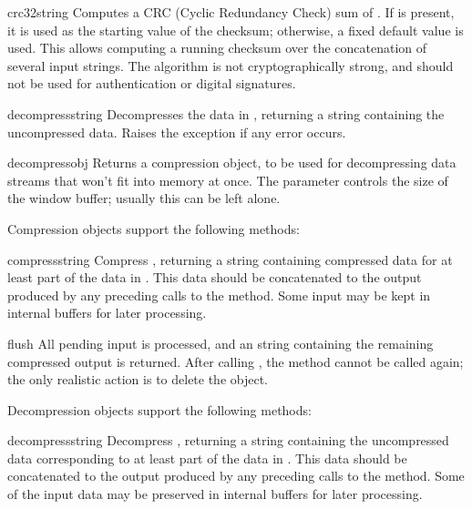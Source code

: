 \begin{funcdesc}{crc32}{string}
   Computes a CRC (Cyclic Redundancy Check) sum of . If
    is present, it is used as the starting value of the
   checksum; otherwise, a fixed default value is used.  This allows
   computing a running checksum over the concatenation of several
   input strings.  The algorithm is not cryptographically strong, and
   should not be used for authentication or digital signatures.
\end{funcdesc}

\begin{funcdesc}{decompress}{string}
Decompresses the data in , returning a string containing
the uncompressed data.  Raises the  exception if any
error occurs.
\end{funcdesc}

\begin{funcdesc}{decompressobj}{}
Returns a compression object, to be used for decompressing data streams
that won't fit into memory at once.  The  parameter
controls the size of the window buffer; usually this can be left
alone.
\end{funcdesc}

Compression objects support the following methods:

\begin{funcdesc}{compress}{string}
Compress , returning a string containing compressed data
for at least part of the data in .  This data should be
concatenated to the output produced by any preceding calls to the
 method.  Some input may be kept in internal buffers
for later processing.
\end{funcdesc}

\begin{funcdesc}{flush}{}
All pending input is processed, and an string containing the remaining
compressed output is returned.  After calling , the
 method cannot be called again; the only realistic
action is to delete the object.
\end{funcdesc}

Decompression objects support the following methods:

\begin{funcdesc}{decompress}{string}
Decompress , returning a string containing the
uncompressed data corresponding to at least part of the data in
.  This data should be concatenated to the output produced
by any preceding calls to the
 method.  Some of the input data may be preserved
in internal buffers for later processing.
\end{funcdesc}

